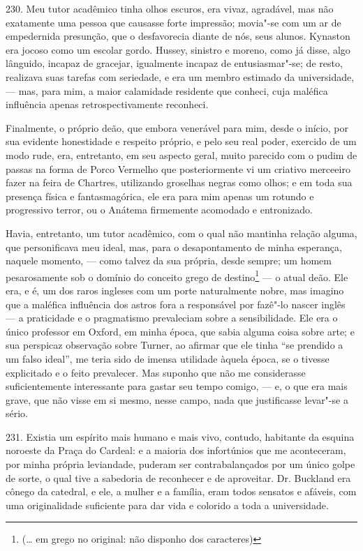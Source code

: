 230. Meu tutor acadêmico tinha olhos escuros, era vivaz, agradável, mas
não exatamente uma pessoa que causasse forte impressão; movia"-se com um
ar de empedernida presunção, que o desfavorecia diante de nós, seus
alunos. Kynaston era jocoso como um escolar gordo. Hussey, sinistro e
moreno, como já disse, algo lânguido, incapaz de gracejar, igualmente
incapaz de entusiasmar"-se; de resto, realizava suas tarefas com
seriedade, e era um membro estimado da universidade, --- mas, para mim, a
maior calamidade residente que conheci, cuja maléfica influência apenas
retrospectivamente reconheci.

Finalmente, o próprio deão, que embora venerável para mim, desde o
início, por sua evidente honestidade e respeito próprio, e pelo seu real
poder, exercido de um modo rude, era, entretanto, em seu aspecto geral,
muito parecido com o pudim de passas na forma de Porco Vermelho que
posteriormente vi um criativo merceeiro fazer na feira de Chartres,
utilizando groselhas negras como olhos; e em toda sua presença física e
fantasmagórica, ele era para mim apenas um rotundo e progressivo terror,
ou o Anátema firmemente acomodado e entronizado.

Havia, entretanto, um tutor acadêmico, com o qual não mantinha relação
alguma, que personificava meu ideal, mas, para o desapontamento de minha
esperança, naquele momento, --- como talvez da sua própria, desde sempre;
um homem pesarosamente sob o domínio do conceito grego de
destino\footnote{(\ldots{} em grego no original: não disponho dos
caracteres)}  --- o atual deão. Ele era, e é, um dos raros ingleses com um
porte naturalmente nobre, mas imagino que a maléfica influência dos
astros fora a responsável por fazê"-lo nascer inglês --- a praticidade e o
pragmatismo prevaleciam sobre a sensibilidade. Ele era o único professor
em Oxford, em minha época, que sabia alguma coisa sobre arte; e sua
perspicaz observação sobre Turner, ao afirmar que ele tinha ``se
prendido a um falso ideal'', me teria sido de imensa utilidade àquela
época, se o tivesse explicitado e o feito prevalecer. Mas suponho que
não me considerasse suficientemente interessante para gastar seu tempo
comigo, --- e, o que era mais grave, que não visse em si mesmo, nesse
campo, nada que justificasse levar"-se a sério.

231. Existia um espírito mais humano e mais vivo, contudo, habitante da
esquina noroeste da Praça do Cardeal: e a maioria dos infortúnios que me
aconteceram, por minha própria leviandade, puderam ser contrabalançados
por um único golpe de sorte, o qual tive a sabedoria de reconhecer e de
aproveitar. Dr. Buckland era cônego da catedral, e ele, a mulher e a
família, eram todos sensatos e afáveis, com uma originalidade suficiente
para dar vida e colorido a toda a universidade.

